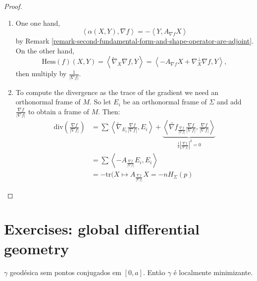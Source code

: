 \begin{proof}
\begin{enumerate}
\item One one hand,
 $$
\left<\alpha(X,Y),\nabla f\right>=-\left<Y,A_{\nabla f}X\right>
$$
by Remark \ref{remark-second-fundamental-form-and-shape-operator-are-adjoint}.
On the other hand,
$$
\text{Hess}(f)(X,Y)=\left<\tilde{\nabla}_X \nabla f,Y\right>=
\left<-A_{\nabla f}X+\nabla_X^\perp \nabla f,Y\right>,
$$
then multiply by $\frac{1}{|\nabla f|}$.

\item To compute the divergence as the trace of the gradient we need an
orthonormal frame of $M$. So let $E_i$ be an orthonormal frame of $\Sigma$ and
add $\frac{\nabla f}{|\nabla f|}$ to obtain a frame of $M$. Then:
\begin{align*}
\text{div}\left(\frac{\nabla f}{|\nabla f|}\right)&=\sum
\left<\tilde{\nabla}_{E_i}\frac{\nabla f}{|\nabla
f|},E_i\right>+\underbrace{\left<\tilde{\nabla f}_{\frac{\nabla f}{|\nabla
f|}}\frac{\nabla f}{|\nabla f|},\frac{\nabla f}{|\nabla
f|}\right>}_{\frac{1}{2}\left|\frac{\nabla f}{|\nabla f|}\right|^2=0}\\
&=\sum \left<-A_{\frac{\nabla f}{|\nabla f|}}E_i,E_i\right>\\
&=-\text{tr}(X \mapsto A_{\frac{\nabla f}{|\nabla f|}}X=-nH_{\Sigma}(p)
\end{align*}

\end{enumerate}
\end{proof}

\section{Exercises: global differential geometry}
\label{section-exercises-global-differential-geometry}

\begin{exercise}
\label{exercise-geodesica-sem-pontos-conjugados-e-localmente-minimizante}
$\gamma$ geodésica sem pontos conjugados em $[0,a]$. Então $\gamma$ é localmente
minimizante.
\end{exercise}

